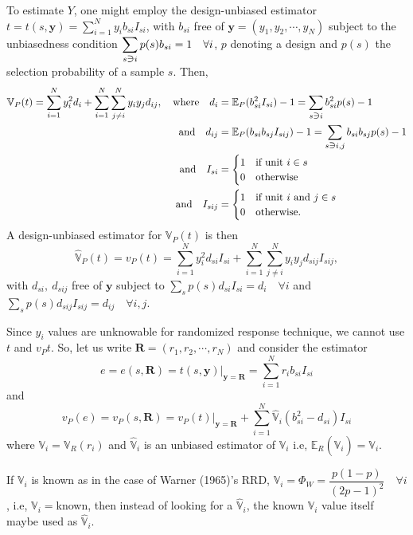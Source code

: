 \documentclass[12pt]{article}
\newcommand{\E}{\mathbb{E}}
\newcommand{\Var}{\mathbb{V}}
\newcommand{\contains}{\reflectbox{$\in$}}
\theoremstyle{definition}
\begin{document}
To estimate $Y$, one might employ the design-unbiased estimator $t=t(s,\mathbf{y})=\displaystyle\sum_{i=1}^N y_ib_{si}I_{si}$, with $b_{si}$ free of $\mathbf{y}=(y_1,y_2,\cdots,y_N)$ subject to the unbiasedness condition $\displaystyle\sum_{s\contains i}p(s)b_{si}=1 \quad \forall i$, $p$ denoting a design and $p(s)$ the selection probability of a sample $s$. Then, 
\begin{align*}
    \Var_P(t)=\sum_{i=1}^N y_i^2d_i +\displaystyle \sum_{i=1}^N \sum_{j\neq i}^N y_iy_jd_{ij}, \quad \text{where}\quad d_i & = \E_P(b_{si}^2I_{si})-1 = \sum_{s\contains i}b_{si}^2p(s)-1\\
    \text{and}\quad d_{ij} & = \E_P(b_{si}b_{sj}I_{sij})-1=\sum_{s\contains i,j}b_{si}b_{sj}p(s)-1\\
    \text{and}\quad I_{si} & = \begin{cases}
    1 & \text{if unit $i \in s$}\\
    0 & \text{otherwise}
    \end{cases}\\
    \text{and}\quad I_{sij} & = \begin{cases}
    1 & \text{if unit $i$ and $j \in s$}\\
    0 & \text{otherwise.}
    \end{cases}
\end{align*}
A design-unbiased estimator for $\Var_P(t)$ is then
$$\hat{\Var}_P(t)=v_P(t)=\sum_{i=1}^N y_i^2d_{si}I_{si} +\displaystyle \sum_{i=1}^N \sum_{j\neq i}^N y_iy_jd_{sij}I_{sij},$$
with $d_{si},\ d_{sij}$ free of $\mathbf{y}$ subject to $\displaystyle\sum_{s}p(s)d_{si}I_{si}=d_i \quad \forall i$ and $\displaystyle\sum_{s}p(s)d_{sij}I_{sij}=d_{ij} \quad \forall i,j$.

Since $y_i$ values are unknowable for randomized response technique, we cannot use $t$ and $v_P{t}$. So, let us write $\mathbf{R}=(r_1,r_2,\cdots,r_N)$ and consider the estimator
$$e = e(s,\mathbf{R})=\left.t(s,\mathbf{y})\right|_{\mathbf{y}=\mathbf{R}}=\sum_{i=1}^N r_ib_{si}I_{si}$$
and
$$v_P(e)=v_P(s,\mathbf{R})=\left.v_P(t)\right|_{\mathbf{y}=\mathbf{R}}+\sum_{i=1}^N \hat{\Var}_i (b_{si}^2-d_{si})I_{si}$$
where $\Var_i = \Var_R(r_i)$ and $\hat{\Var}_i$ is an unbiased estimator of $\Var_i$ i.e, $\E_R(\hat{\Var}_i)=\Var_i$.

If $\Var_i$ is known as in the case of Warner (1965)'s RRD, $\Var_i=\Phi_W=\dfrac{p(1-p)}{(2p-1)^2}\quad \forall i$, i.e, $\Var_i=$known, then instead of looking for a $\hat{\Var}_i$, the known $\Var_i$ value itself maybe used as $\hat{\Var}_i$. 
\end{document}
